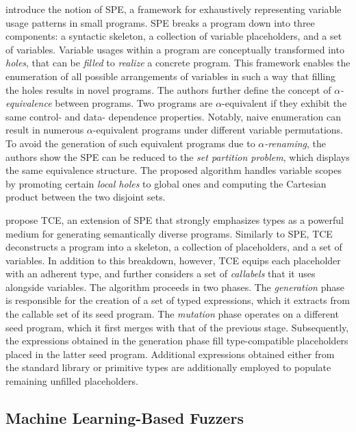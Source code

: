 \citet{zhang2017skeletal} introduce the notion of \gls{SPE}, a framework
for exhaustively representing variable usage patterns in small programs.
\gls{SPE} breaks a program down into three components: a syntactic skeleton,
a collection of variable placeholders, and a set of variables.
Variable usages within a program are conceptually transformed into \textit{holes},
that can be \textit{filled} to \textit{realize} a concrete program.
This framework enables the enumeration of all possible arrangements
of variables in such a way that filling the holes results in novel programs.
The authors further define the concept of $\alpha$\textit{-equivalence} between
programs.
Two programs are $\alpha$-equivalent if they exhibit the same control- and data-
dependence properties.
Notably, naive enumeration can result in numerous $\alpha$-equivalent programs
under different variable permutations.
To avoid the generation of such equivalent programs due to $\alpha$\textit{-renaming},
the authors show the \gls{SPE} can be reduced to the \textit{set partition problem},
which displays the same equivalence structure.
The proposed algorithm handles variable scopes by promoting certain
\textit{local holes} to global ones and computing the Cartesian product 
between the two disjoint sets.


\citet{stepanov2021type} propose \Gls{TCE}, an extension of \gls{SPE} 
that strongly emphasizes types as a powerful medium for generating
semantically diverse programs.
Similarly to \gls{SPE}, \gls{TCE} deconstructs a program into a 
skeleton, a collection of placeholders, and a set of variables.
In addition to this breakdown, however, \gls{TCE} equips each 
placeholder with an adherent type, and further considers a set
of \textit{callabels} that it uses alongside variables.
The algorithm proceeds in two phases.
The \textit{generation} phase is responsible for the 
creation of a set of typed expressions, which it extracts from
the callable set of its seed program.
The \textit{mutation} phase operates on a different seed program,
which it first merges with that of the previous stage.
Subsequently, the expressions obtained in the generation phase
fill type-compatible placeholders placed in the latter seed program.
Additional expressions obtained either from the standard library 
or primitive types are additionally employed to populate
remaining unfilled placeholders.

\subsection{\label{subsec:ml-fuzzers}Machine Learning-Based Fuzzers}


